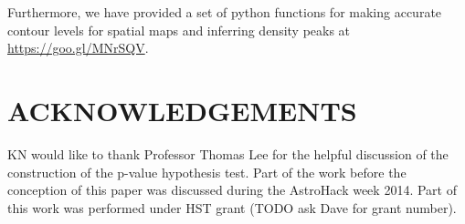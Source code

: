 Furthermore, we have provided a set of python functions for making accurate 
contour levels for spatial maps and inferring density peaks at 
\href{https://goo.gl/MNrSQV}{https://goo.gl/MNrSQV}.
% 
% 
% 
% 
% 
% 
% 


\section{ACKNOWLEDGEMENTS}
KN would like to thank Professor Thomas Lee for the helpful discussion of 
the construction of the p-value hypothesis test. 
Part of the work before the conception of this paper was discussed during 
the AstroHack week 2014. 
Part of this work was performed under HST grant (TODO ask Dave for grant
number). 
% 
% 
% 
% 
% 
% 
% 
